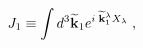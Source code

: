 \begin{equation}
J_1  
\equiv 
\int d^3 \widetilde{\bf k}_1 
e^{i\; \widetilde{\bf k}_1^\lambda X_\lambda} \;,
\label{J_1}
\end{equation}

